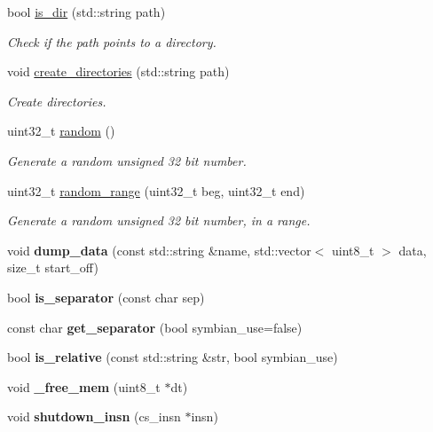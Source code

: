 \begin{DoxyCompactItemize}
\mbox{\label{namespaceeka2l1_a479bfec84583dd984d76388fc0c9a104}} 
bool \mbox{\hyperlink{namespaceeka2l1_a479bfec84583dd984d76388fc0c9a104}{is\+\_\+dir}} (std\+::string path)
\begin{DoxyCompactList}\small\item\em Check if the path points to a directory. \end{DoxyCompactList}\item 
\mbox{\label{namespaceeka2l1_ab28caaf7dea8a8e4c22dad036199c94a}} 
void \mbox{\hyperlink{namespaceeka2l1_ab28caaf7dea8a8e4c22dad036199c94a}{create\+\_\+directories}} (std\+::string path)
\begin{DoxyCompactList}\small\item\em Create directories. \end{DoxyCompactList}\item 
uint32\+\_\+t \mbox{\hyperlink{namespaceeka2l1_acb2c880cfe6f9726bb5c5fccc2c7381b}{random}} ()
\begin{DoxyCompactList}\small\item\em Generate a random unsigned 32 bit number. \end{DoxyCompactList}\item 
uint32\+\_\+t \mbox{\hyperlink{namespaceeka2l1_afe59d27e6c6ed6d22a242873174d4872}{random\+\_\+range}} (uint32\+\_\+t beg, uint32\+\_\+t end)
\begin{DoxyCompactList}\small\item\em Generate a random unsigned 32 bit number, in a range. \end{DoxyCompactList}\item 
\mbox{\label{namespaceeka2l1_a89209d5af922e70ea5208cb781e4f290}} 
void {\bfseries dump\+\_\+data} (const std\+::string \&name, std\+::vector$<$ uint8\+\_\+t $>$ data, size\+\_\+t start\+\_\+off)
\item 
\mbox{\label{namespaceeka2l1_abaf6ac702910570200f7c848d2a8b9bc}} 
bool {\bfseries is\+\_\+separator} (const char sep)
\item 
\mbox{\label{namespaceeka2l1_ae07c33c7bac025b2e524173603d29cc0}} 
const char {\bfseries get\+\_\+separator} (bool symbian\+\_\+use=false)
\item 
\mbox{\label{namespaceeka2l1_ab304974cd7cea75652edd9bddb2187c9}} 
bool {\bfseries is\+\_\+relative} (const std\+::string \&str, bool symbian\+\_\+use)
\item 
\mbox{\label{namespaceeka2l1_ada04d2847de14791e3daeb86873d8ce8}} 
void {\bfseries \+\_\+free\+\_\+mem} (uint8\+\_\+t $\ast$dt)
\item 
\mbox{\label{namespaceeka2l1_a4ce32debc2e4ade9944afcfa8738d844}} 
void {\bfseries shutdown\+\_\+insn} (cs\+\_\+insn $\ast$insn)
\end{DoxyCompactItemize}
